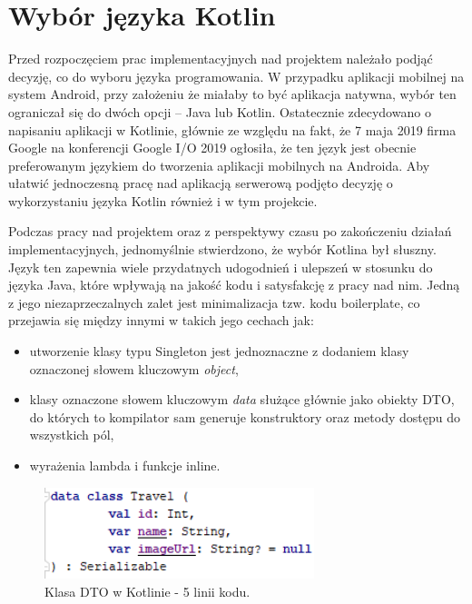 \documentclass[10pt,twoside,a4paper]{report}
\begin{document}
\section{Wybór języka Kotlin}
\par Przed rozpoczęciem prac implementacyjnych nad projektem należało podjąć decyzję, co do wyboru języka programowania. W przypadku aplikacji mobilnej na system Android, przy założeniu że miałaby to być aplikacja natywna, wybór ten ograniczał się do dwóch opcji – Java lub Kotlin. Ostatecznie zdecydowano o napisaniu aplikacji w Kotlinie, głównie ze względu na fakt, że 7 maja 2019 firma Google na konferencji Google I/O 2019 ogłosiła, że ten język jest obecnie preferowanym językiem do tworzenia aplikacji mobilnych na Androida\cite{Google I/O 2019}. Aby ułatwić jednoczesną pracę nad aplikacją serwerową podjęto decyzję o wykorzystaniu języka Kotlin również i w tym projekcie.
\par Podczas pracy nad projektem oraz z perspektywy czasu po zakończeniu działań implementacyjnych, jednomyślnie stwierdzono, że wybór Kotlina był słuszny. Język ten zapewnia wiele przydatnych udogodnień i ulepszeń w stosunku do języka Java, które wpływają na jakość kodu i satysfakcję z pracy nad nim. Jedną z jego niezaprzeczalnych zalet jest minimalizacja tzw. kodu boilerplate, co przejawia się między innymi w takich jego cechach jak: 

\begin{itemize}
\item utworzenie klasy typu Singleton jest jednoznaczne z dodaniem klasy oznaczonej słowem kluczowym \textit{object},
\item klasy oznaczone słowem kluczowym \textit{data} służące głównie jako obiekty DTO, do których to kompilator sam generuje konstruktory oraz metody dostępu do wszystkich pól,
\item wyrażenia lambda i funkcje inline.
\end{itemize}

\begin{figure}[h]
\centering
\includegraphics[width=0.7\textwidth]{dtoKotlin}
\caption{Klasa DTO w Kotlinie - 5 linii kodu.}
\label{fig:dtoKotlin}
\end{figure}
\end{document}
